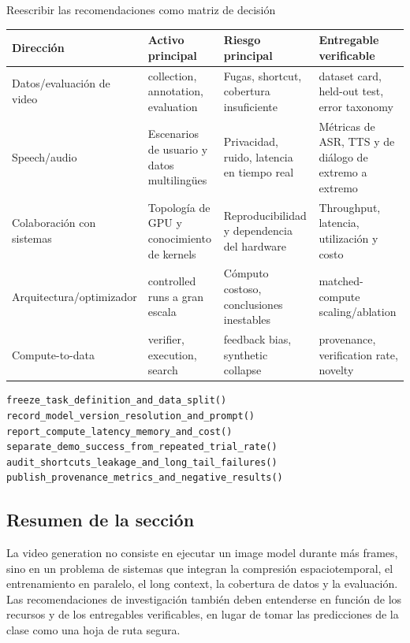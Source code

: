 \documentclass[a4paper]{article}
\begin{document}
\begin{knowledgebox}{Reescribir las recomendaciones como matriz de decisión}
\small\sloppy
\begin{tabularx}{\textwidth}{L{0.17\textwidth} L{0.20\textwidth} L{0.20\textwidth} X}
\toprule
Dirección & Activo principal & Riesgo principal & Entregable verificable \\
\midrule
Datos/evaluación de video & collection, annotation, evaluation & Fugas, shortcut, cobertura insuficiente & dataset card, held-out test, error taxonomy \\
Speech/audio & Escenarios de usuario y datos multilingües & Privacidad, ruido, latencia en tiempo real & Métricas de ASR, TTS y de diálogo de extremo a extremo \\
Colaboración con sistemas & Topología de GPU y conocimiento de kernels & Reproducibilidad y dependencia del hardware & Throughput, latencia, utilización y costo \\
Arquitectura/optimizador & controlled runs a gran escala & Cómputo costoso, conclusiones inestables & matched-compute scaling/ablation \\
Compute-to-data & verifier, execution, search & feedback bias, synthetic collapse & provenance, verification rate, novelty \\
\bottomrule
\end{tabularx}
\end{knowledgebox}

\begin{lstlisting}[caption={Verificación previa a la publicación de un proyecto de investigación multimodal}]
freeze_task_definition_and_data_split()
record_model_version_resolution_and_prompt()
report_compute_latency_memory_and_cost()
separate_demo_success_from_repeated_trial_rate()
audit_shortcuts_leakage_and_long_tail_failures()
publish_provenance_metrics_and_negative_results()
\end{lstlisting}


\subsection{Resumen de la sección}

La video generation no consiste en ejecutar un image model durante más frames, sino en un problema de sistemas que integran la compresión espaciotemporal, el entrenamiento en paralelo, el long context, la cobertura de datos y la evaluación. Las recomendaciones de investigación también deben entenderse en función de los recursos y de los entregables verificables, en lugar de tomar las predicciones de la clase como una hoja de ruta segura.
\end{document}
